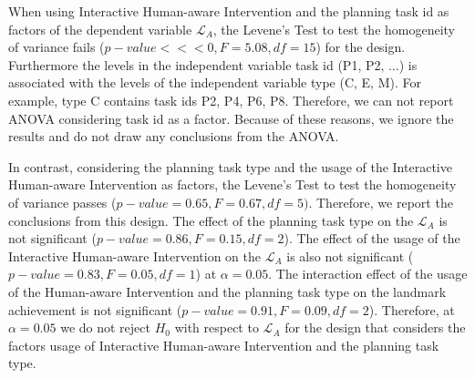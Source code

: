 When using Interactive Human-aware Intervention and the planning task id as factors of the dependent variable $\mathcal{L}_A$, the Levene's Test to test the homogeneity of variance fails ($p-value<<<0, F=5.08, df=15$) for the design.
Furthermore the levels in the independent variable task id (P1, P2, $\ldots$) is associated with the levels of the independent variable type (C, E, M).
For example, type C contains task ids P2, P4, P6, P8.
Therefore, we can not report ANOVA considering task id as a factor.
Because of these reasons, we ignore the results and do not draw any conclusions from the ANOVA.

In contrast, considering the planning task type and the usage of the Interactive Human-aware Intervention as factors, the Levene's Test to test the homogeneity of variance passes ($p-value=0.65, F=0.67, df=5)$.
Therefore, we report the conclusions from this design.
The effect of the planning task type on the $\mathcal{L}_A$ is not significant ($p-value=0.86, F=0.15, df=2$).
The effect of the usage of the Interactive Human-aware Intervention on the $\mathcal{L}_A$ is also not significant ($p-value=0.83, F=0.05, df=1$) at $\alpha=0.05$.
The interaction effect of the usage of the Human-aware Intervention and the planning task type on the landmark achievement is not significant ($p-value=0.91, F=0.09, df=2$).
Therefore, at $\alpha=0.05$ we do not reject $H_0$ with respect to $\mathcal{L}_A$ for the design that considers the factors usage of Interactive Human-aware Intervention and the planning task type.


